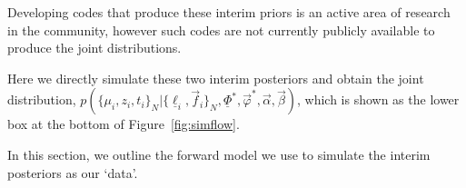 \documentclass[12pt, twocolumn]{emulateapj}
\newcommand{\textul}{\underline}
\begin{document}
Developing codes that produce these interim priors is an active area of research in the community, however such codes are not currently publicly available to produce the joint distributions. 

Here we directly simulate these two interim posteriors and obtain the joint distribution, $p(\{\mu_{i}, z_{i}, t_{i}\}_{N} | \{\textul{\ell}_{i}, \vec{f}_{i}\}_{N}, \textul{\Phi}^{*}, \vec{\varphi}^{*}, \vec{\alpha}, \vec{\beta})$, which is shown as the lower box at the bottom of Figure~\ref{fig:simflow}.

In this section, we outline the forward model we use to simulate the interim posteriors as our `data'.
\end{document}
